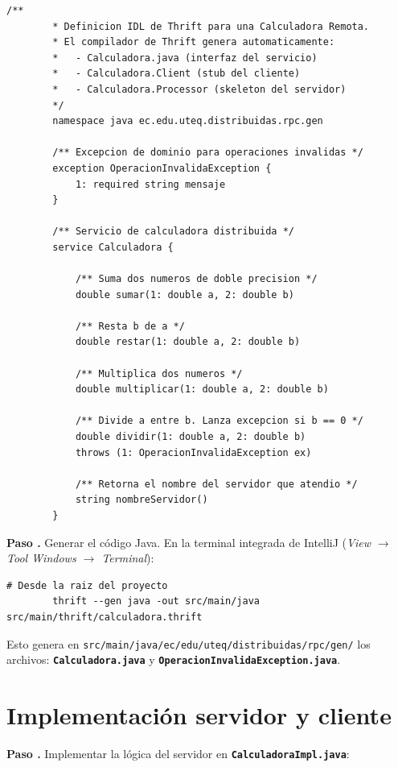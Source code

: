 \documentclass[12pt, a4paper, openany]{book}
\newcounter{paso}[section]
\newcommand{\paso}[1]{%
	\stepcounter{paso}%
	\medskip\noindent
	\begin{tcolorbox}[enhanced, colback=white, colframe=practiceBlue,
		boxrule=0.8pt, arc=3pt, left=6pt, right=6pt, top=4pt, bottom=4pt,
		before upper={\noindent}]
		\textcolor{practiceBlue}{\textbf{Paso \arabic{paso}.}} #1
	\end{tcolorbox}%
}
\newcommand{\code}[1]{\texttt{\small#1}}
\newcommand{\archivo}[1]{\texttt{\textbf{#1}}}
\newcommand{\menu}[1]{\textit{#1}}
\begin{document}
	\begin{lstlisting}[style=ProtoStyle, caption={calculadora.thrift --- Definición IDL de la calculadora remota}]
		/**
		* Definicion IDL de Thrift para una Calculadora Remota.
		* El compilador de Thrift genera automaticamente:
		*   - Calculadora.java (interfaz del servicio)
		*   - Calculadora.Client (stub del cliente)
		*   - Calculadora.Processor (skeleton del servidor)
		*/
		namespace java ec.edu.uteq.distribuidas.rpc.gen
		
		/** Excepcion de dominio para operaciones invalidas */
		exception OperacionInvalidaException {
			1: required string mensaje
		}
		
		/** Servicio de calculadora distribuida */
		service Calculadora {
			
			/** Suma dos numeros de doble precision */
			double sumar(1: double a, 2: double b)
			
			/** Resta b de a */
			double restar(1: double a, 2: double b)
			
			/** Multiplica dos numeros */
			double multiplicar(1: double a, 2: double b)
			
			/** Divide a entre b. Lanza excepcion si b == 0 */
			double dividir(1: double a, 2: double b)
			throws (1: OperacionInvalidaException ex)
			
			/** Retorna el nombre del servidor que atendio */
			string nombreServidor()
		}
	\end{lstlisting}
	
	\paso{Generar el código Java. En la terminal integrada de IntelliJ
		(\menu{View $\to$ Tool Windows $\to$ Terminal}):}
	
	\begin{lstlisting}[style=BashStyle]
		# Desde la raiz del proyecto
		thrift --gen java -out src/main/java src/main/thrift/calculadora.thrift
	\end{lstlisting}
	
	Esto genera en \code{src/main/java/ec/edu/uteq/distribuidas/rpc/gen/}
	los archivos: \archivo{Calculadora.java} y \archivo{OperacionInvalidaException.java}.
	
	\section{Implementación servidor y cliente}
	
	\paso{Implementar la lógica del servidor en \archivo{CalculadoraImpl.java}:}
	
\end{document}
